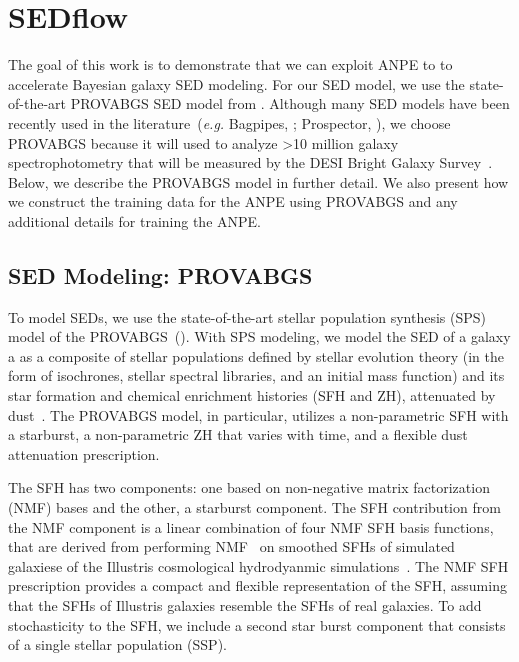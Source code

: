 \section{SEDflow} \label{sec:sedflow}
The goal of this work is to demonstrate that we can exploit ANPE to to
accelerate Bayesian galaxy SED modeling.  
For our SED model, we use the state-of-the-art PROVABGS SED model from
\cite{hahn2022}. 
Although many SED models have been recently used in the
literature~(\emph{e.g.} {\sc Bagpipes}, \citealt{carnall2017}; 
{\sc Prospector}, \citealt{leja2017, johnson2021}), we choose PROVABGS because
it will used to analyze >10 million galaxy spectrophotometry that will be
measured by the DESI Bright Galaxy Survey~\citep{ruiz-macias2021, hahn2022a}.
Below, we describe the PROVABGS model in further detail.
We also present how we construct the training data for the ANPE using PROVABGS
and any additional details for training the ANPE. 

\subsection{SED Modeling: PROVABGS} \label{sec:provabgs}
To model SEDs, we use the state-of-the-art stellar population synthesis (SPS)
model of the PROVABGS~(). 
With SPS modeling, we model the SED of a galaxy a as a composite of stellar
populations defined by stellar evolution theory (in the form of isochrones,
stellar spectral libraries, and an initial mass function) and its star
formation and chemical enrichment histories (SFH and ZH), attenuated by
dust~\citep[see][for a review]{conroy2013}. 
The PROVABGS model, in particular, utilizes a non-parametric SFH with a
starburst, a non-parametric ZH that varies with time, and a flexible dust
attenuation prescription.

The SFH has two components: one based on non-negative matrix factorization
(NMF) bases and the other, a starburst component.
The SFH contribution from the NMF component is a linear combination of four NMF
SFH basis functions, that are derived from performing NMF~\citep{lee1999,
cichocki2009, fevotte2011}
on smoothed SFHs of simulated galaxiese of the Illustris cosmological
hydrodyanmic simulations~\citep{vogelsberger2014, genel2014, nelson2015}.
The NMF SFH prescription provides a compact and flexible representation of the
SFH, assuming that the SFHs of Illustris galaxies resemble the SFHs of real
galaxies. 
To add stochasticity to the SFH, we include a second star burst component that
consists of a single stellar population (SSP). 

